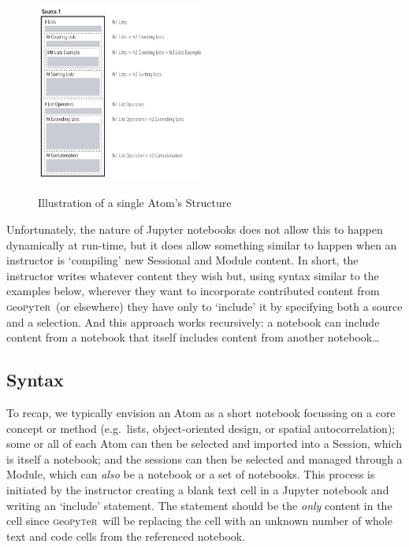 \documentclass[letter, 11pt,titlepage]{article}
\newcommand{\gp}{\textsc{g}eo\textsc{p}y\textsc{t}e\textsc{r}~\/}
\newcommand{\eg}{e.g.~\/}
\begin{document}
\begin{figure}[htbp]
  \centering
  \caption{Illustration of a single Atom's Structure}
  \includegraphics[width=0.5\textwidth]{Single_Document.pdf}
  \label{fig:structure}
\end{figure}

Unfortunately, the nature of Jupyter notebooks does not allow this to happen dynamically at run-time, but it does allow something similar to happen when an instructor is `compiling' new Sessional and Module content. In short, the instructor writes whatever content they wish but, using syntax similar to the examples below, wherever they want to incorporate contributed content from \gp (or elsewhere) they have only to `include' it by specifying both a source and a selection. And this approach works recursively: a notebook can include content from a notebook that itself includes content from another notebook\ldots

\subsection{Syntax}\label{syntax}

To recap, we typically envision an Atom as a short notebook focussing on a core concept or method (\eg lists, object-oriented design, or spatial autocorrelation); some or all of each Atom can then be selected and imported into a Session, which is itself a notebook; and the sessions can then be selected and managed through a Module, which can \emph{also} be a notebook or a set of notebooks. This process is initiated by the instructor creating a blank text cell in a Jupyter notebook and writing an `include' statement. The statement should be the \emph{only} content in the cell since \gp will be replacing the cell with an unknown number of whole text and code cells from the referenced notebook.
\end{document}
